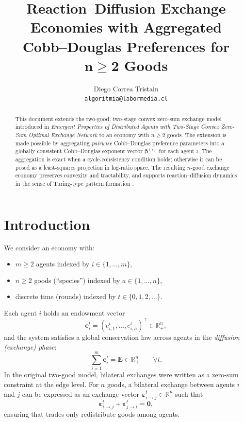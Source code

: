 \documentclass[11pt]{article}
\title{\textbf{Reaction--Diffusion Exchange Economies with Aggregated\\
Cobb--Douglas Preferences for \(\mathbf{n \ge 2}\) Goods}}
\author{Diego Correa Tristain \\ \texttt{algoritmia@labormedia.cl}}
\begin{document}
\maketitle

\begin{abstract}
This document extends the two-good, two-stage convex zero-sum exchange model introduced in
\emph{Emergent Properties of Distributed Agents with Two-Stage Convex Zero-Sum Optimal Exchange Network} \parencite{Tristain2024}
to an economy with \(n \ge 2\) goods. The extension is made possible by aggregating
\emph{pairwise} Cobb--Douglas preference parameters into a globally consistent
Cobb--Douglas exponent vector \(\bm{\beta}^{(i)}\) for each agent \(i\).
The aggregation is exact when a cycle-consistency condition holds; otherwise it can be posed as a least-squares
projection in log-ratio space. The resulting \(n\)-good exchange economy preserves convexity and tractability, and
supports reaction--diffusion dynamics in the sense of Turing-type pattern formation \parencite{Turing1952}.
\end{abstract}

\section{Introduction}

We consider an economy with:
\begin{itemize}[leftmargin=*]
  \item \(m \ge 2\) agents indexed by \(i \in \{1,\dots,m\}\),
  \item \(n \ge 2\) goods (``species'') indexed by \(a \in \{1,\dots,n\}\),
  \item discrete time (rounds) indexed by \(t \in \{0,1,2,\dots\}\).
\end{itemize}

Each agent \(i\) holds an endowment vector
\[
\bm{e}_i^t = (e_{i,1}^t,\dots,e_{i,n}^t)^\top \in \mathbb{R}_+^n,
\]
and the system satisfies a global conservation law across agents in the \emph{diffusion (exchange) phase}:
\[
\sum_{i=1}^m \bm{e}_i^t = \bm{E} \in \mathbb{R}_+^n \qquad \forall t.
\]
In the original two-good model, bilateral exchanges were written as a zero-sum constraint at the edge level.
For \(n\) goods, a bilateral exchange between agents \(i\) and \(j\) can be expressed as an exchange vector
\(\bm{\varepsilon}_{i \to j}^{t} \in \mathbb{R}^n\) such that
\[
\bm{\varepsilon}_{i \to j}^{t} + \bm{\varepsilon}_{j \to i}^{t} = \bm{0},
\]
ensuring that trades only redistribute goods among agents.
\end{document}
